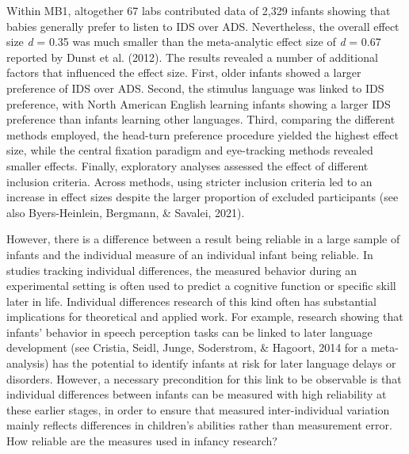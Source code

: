 \documentclass[
  man,floatsintext]{apa6}
\begin{document}
Within MB1, altogether 67 labs contributed data of 2,329 infants showing that babies generally prefer to listen to IDS over ADS.
Nevertheless, the overall effect size \emph{d} = 0.35 was much smaller than the meta-analytic effect size of \emph{d} = 0.67 reported by Dunst et al. (2012).
The results revealed a number of additional factors that influenced the effect size.
First, older infants showed a larger preference of IDS over ADS.
Second, the stimulus language was linked to IDS preference, with North American English learning infants showing a larger IDS preference than infants learning other languages.
Third, comparing the different methods employed, the head-turn preference procedure yielded the highest effect size, while the central fixation paradigm and eye-tracking methods revealed smaller effects.
Finally, exploratory analyses assessed the effect of different inclusion criteria.
Across methods, using stricter inclusion criteria led to an increase in effect sizes despite the larger proportion of excluded participants (see also Byers-Heinlein, Bergmann, \& Savalei, 2021).

However, there is a difference between a result being reliable in a large sample of infants and the individual measure of an individual infant being reliable.
In studies tracking individual differences, the measured behavior during an experimental setting is often used to predict a cognitive function or specific skill later in life.
Individual differences research of this kind often has substantial implications for theoretical and applied work.
For example, research showing that infants' behavior in speech perception tasks can be linked to later language development (see Cristia, Seidl, Junge, Soderstrom, \& Hagoort, 2014 for a meta-analysis) has the potential to identify infants at risk for later language delays or disorders.
However, a necessary precondition for this link to be observable is that individual differences between infants can be measured with high reliability at these earlier stages, in order to ensure that measured inter-individual variation mainly reflects differences in children's abilities rather than measurement error.
How reliable are the measures used in infancy research?
\end{document}
